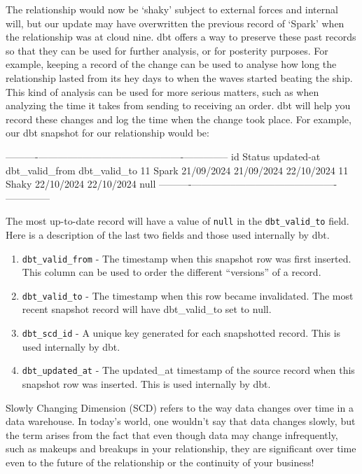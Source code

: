 \documentclass[
]{book}
\begin{document}
The relationship would now be `shaky' subject to external forces and internal will, but our update may have overwritten the previous record of `Spark' when the relationship was at cloud nine. dbt offers a way to preserve these past records so that they can be used for further analysis, or for posterity purposes. For example, keeping a record of the change can be used to analyse how long the relationship lasted from its hey days to when the waves started beating the ship. This kind of analysis can be used for more serious matters, such as when analyzing the time it takes from sending to receiving an order. dbt will help you record these changes and log the time when the change took place. For example, our dbt snapshot for our relationship would be:

\textbar----------\textbar--------------\textbar---------------\textbar----------------\textbar--------------\textbar{}
\textbar{} id \textbar{} Status \textbar{} updated-at \textbar{} dbt\_valid\_from \textbar{} dbt\_valid\_to \textbar{}
\textbar{} 11 \textbar{} Spark \textbar{} 21/09/2024 \textbar{} 21/09/2024 \textbar{} 22/10/2024 \textbar{}
\textbar{} 11 \textbar{} Shaky \textbar{} 22/10/2024 \textbar{} 22/10/2024 \textbar{} null \textbar{}
\textbar----------\textbar--------------\textbar---------------\textbar----------------\textbar--------------\textbar{}

The most up-to-date record will have a value of \texttt{null} in the \texttt{dbt\_valid\_to} field. Here is a description of the last two fields and those used internally by dbt.

\begin{enumerate}
\def\labelenumi{\arabic{enumi}.}
\item
  \texttt{dbt\_valid\_from} - The timestamp when this snapshot row was first inserted. This column can be used to order the different ``versions'' of a record.
\item
  \texttt{dbt\_valid\_to} - The timestamp when this row became invalidated. The most recent snapshot record will have dbt\_valid\_to set to null.
\item
  \texttt{dbt\_scd\_id} - A unique key generated for each snapshotted record. This is used internally by dbt.
\item
  \texttt{dbt\_updated\_at} - The updated\_at timestamp of the source record when this snapshot row was inserted. This is used internally by dbt.
\end{enumerate}

Slowly Changing Dimension (SCD) refers to the way data changes over time in a data warehouse. In today's world, one wouldn't say that data changes slowly, but the term arises from the fact that even though data may change infrequently, such as makeups and breakups in your relationship, they are significant over time even to the future of the relationship or the continuity of your business!
\end{document}
